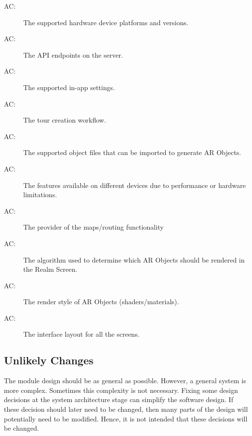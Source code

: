 \documentclass[12pt, titlepage]{article}
\newcounter{acnum}
\newcommand{\actheacnum}{AC\theacnum}
\begin{document}
\begin{description}
\item[ \actheacnum \label{acHardware}:] The supported hardware device platforms and versions.
\item[ \actheacnum \label{acAPI}:] The API endpoints on the server.
\item[ \actheacnum \label{acSettings}:] The supported in-app settings.
\item[ \actheacnum \label{acTour}:] The tour creation workflow.
\item[ \actheacnum \label{acObjectImport}:] The supported object files that can be imported to generate AR Objects.
\item[ \actheacnum \label{acPerformance}:] The features available on different devices due to performance or hardware limitations.
\item[ \actheacnum \label{acMaps}:] The provider of the maps/routing functionality
\item[ \actheacnum \label{acRenderNumber}:] The algorithm used to determine which AR Objects should be rendered in the Realm Screen.
\item[ \actheacnum \label{acRenderStyle}:] The render style of AR Objects (shaders/materials).
\item[ \actheacnum \label{acInterfaces}:] The interface layout for all the screens.
\end{description}

\newpage

\subsection{Unlikely Changes} \label{SecUchange}

The module design should be as general as possible. However, a general system is
more complex. Sometimes this complexity is not necessary. Fixing some design
decisions at the system architecture stage can simplify the software design. If
these decision should later need to be changed, then many parts of the design
will potentially need to be modified. Hence, it is not intended that these
decisions will be changed.
\end{document}
